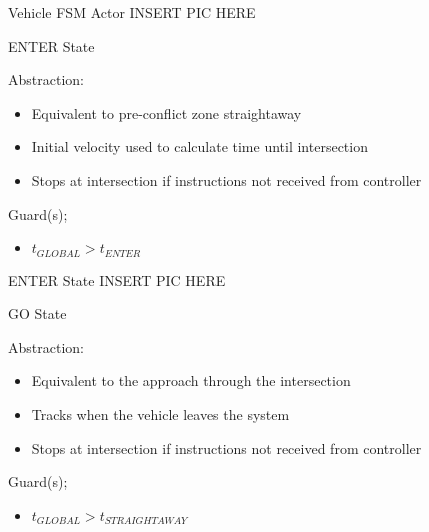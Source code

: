 \documentclass{beamer}
\begin{document}
\begin{frame}{Vehicle FSM Actor}
INSERT PIC HERE
\end{frame}

\begin{frame}{ENTER State}
\begin{minipage}{0.45\linewidth}
Abstraction:
\begin{itemize}
\item Equivalent to pre-conflict zone straightaway 
\item Initial velocity used to calculate time until intersection
\item Stops at intersection if instructions not received from controller
\end{itemize}
\end{minipage}
\hfill
\begin{minipage}{0.45\linewidth}
Guard(s);
\begin{itemize}
\item $t_{GLOBAL} > t_{ENTER}$
\end{itemize}
\end{minipage}
\end{frame}

\begin{frame}{ENTER State}
INSERT PIC HERE
\end{frame}

\begin{frame}{GO State}
\begin{minipage}{0.45\linewidth}
Abstraction:
\begin{itemize}
\item Equivalent to the approach through the intersection
\item Tracks when the vehicle leaves the system
\item Stops at intersection if instructions not received from controller
\end{itemize}
\end{minipage}
\hfill
\begin{minipage}{0.45\linewidth}
Guard(s);
\begin{itemize}
\item $t_{GLOBAL} > t_{STRAIGHTAWAY}$
\end{itemize}
\end{minipage}
\end{frame}
\end{document}
